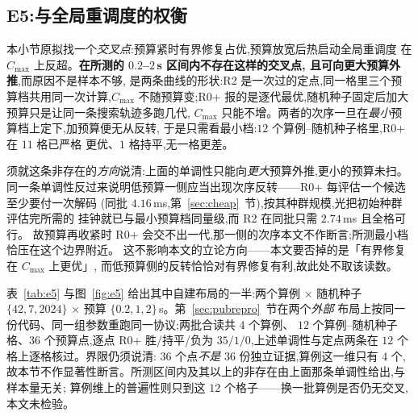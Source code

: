 \documentclass[manuscript,screen,review]{acmart}
\newcommand{\EfiveInst}{4}          %
\newcommand{\EfiveCells}{12}        %
\newcommand{\EfivePts}{36}          %
\newcommand{\EfiveWLT}{35/1/0}      %
\newcommand{\EfiveWinMin}{11}       %
\newcommand{\EfiveTieMin}{1}        %
\newcommand{\MsRedecode}{4.16}       %
\newcommand{\MsCheapRtwo}{2.74}      %
\begin{document}
\subsection{E5:与全局重调度的权衡}
\label{sec:e5}

本小节原拟找一个\emph{交叉点}:预算紧时有界修复占优,预算放宽后热启动全局重调度
在 \(C_{\max}\) 上反超。\textbf{在所测的 \(0.2\)--\(2\)\,s 区间内不存在这样的交叉点,
且可向更大预算外推},而原因不是样本不够,
是两条曲线的形状:R2 是一次过的定点,同一格里三个预算档共用同一次计算,\(C_{\max}\)
不随预算变;R0+ 报的是逐代最优,随机种子固定后加大预算只是让同一条搜索轨迹多跑几代,
\(C_{\max}\) 只能不增。两者的次序一旦在\emph{最小}预算档上定下,加预算便无从反转,
于是只需看最小档:\(\EfiveCells\) 个算例--随机种子格里,R0+ 在 \(\EfiveWinMin\) 格已严格
更优、\(\EfiveTieMin\) 格持平,无一格更差。

须就这条非存在的\emph{方向}说清:上面的单调性只能向\emph{更大}预算外推,更小的预算未扫。
同一条单调性反过来说明低预算一侧应当出现次序反转——R0+ 每评估一个候选至少要付一次解码
(同批 \(\MsRedecode\)\,ms,第~\ref{sec:cheap}~节),按其种群规模,光把初始种群评估完所需的
挂钟就已与最小预算档同量级,而 R2 在同批只需 \(\MsCheapRtwo\)\,ms 且全格可行。
故预算再收紧时 R0+ 会交不出一代,那一侧的次序本文不作断言;所测最小档恰压在这个边界附近。
这不影响本文的立论方向——本文要否掉的是「有界修复在 \(C_{\max}\) 上更优」,
而低预算侧的反转恰恰对有界修复有利,故此处不取该读数。

表~\ref{tab:e5} 与图~\ref{fig:e5} 给出其中自建布局的一半:两个算例 \(\times\) 随机种子
\(\{42,7,2024\}\) \(\times\) 预算 \(\{0.2,1,2\}\)\,s。第~\ref{sec:pubrepro}~节在两个\emph{外部}
布局上按同一份代码、同一组参数重跑同一协议;两批合读共 \(\EfiveInst\) 个算例、
\(\EfiveCells\) 个算例--随机种子格、\(\EfivePts\) 个预算点,逐点 R0+ 胜/持平/负为
\(\EfiveWLT\),上述单调性与定点两条在 \(\EfiveCells\) 个格上逐格核过。界限仍须说清:
\(\EfivePts\) 个点\emph{不是} \(\EfivePts\) 份独立证据,算例这一维只有 \(\EfiveInst\) 个,
故本节不作显著性断言。所测区间内及其以上的非存在由上面那条单调性给出,与样本量无关;
算例维上的普遍性则只到这 \(\EfiveCells\) 个格子——换一批算例是否仍无交叉,本文未检验。
\end{document}
